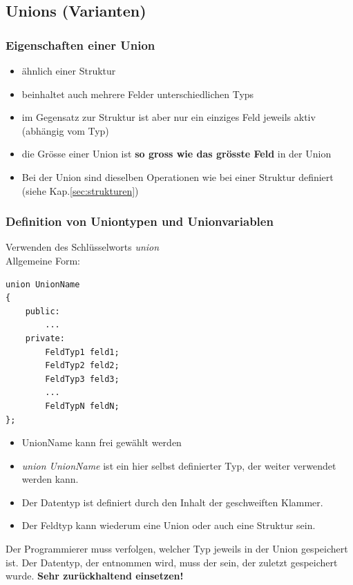 \subsection{Unions (Varianten)}

\subsubsection{Eigenschaften einer Union}
\begin{itemize}
	\item ähnlich einer Struktur
	\item beinhaltet auch mehrere Felder unterschiedlichen Typs
	\item im Gegensatz zur Struktur ist aber nur ein einziges Feld jeweils aktiv (abhängig vom Typ)
	\item die Grösse einer Union ist \textbf{so gross wie das grösste Feld} in der Union
	\item Bei der Union sind dieselben Operationen wie bei einer Struktur definiert (siehe Kap.\ref{sec:strukturen})
\end{itemize}

\subsubsection{Definition von Uniontypen und Unionvariablen}
Verwenden des Schlüsselworts \emph{union}\\
Allgemeine Form:\\
\begin{multicols}{2}
\vspace{-\baselineskip}
\begin{minipage}{\linewidth}
\begin{lstlisting}
union UnionName
{
	public:				
		...
	private:
		FeldTyp1 feld1;
		FeldTyp2 feld2;
		FeldTyp3 feld3;
		...
		FeldTypN feldN;
};
\end{lstlisting}
\end{minipage}
\vfill\null
\columnbreak
\begin{itemize}
	\item UnionName kann frei gewählt werden
	\item \emph{union UnionName} ist ein hier selbst definierter Typ, der weiter verwendet werden kann.
	\item Der Datentyp ist definiert durch den Inhalt der geschweiften Klammer.
	\item Der Feldtyp kann wiederum eine Union oder auch eine Struktur sein.
\end{itemize}
\end{multicols}
\begin{achtung}
Der Programmierer muss verfolgen, welcher Typ jeweils in der Union gespeichert ist. Der Datentyp, der entnommen wird, muss der sein, der zuletzt gespeichert wurde. \textbf{Sehr zurückhaltend einsetzen!}
\end{achtung}

